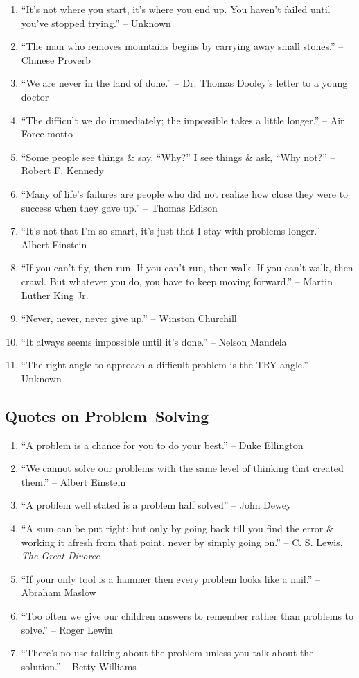 \documentclass{article}
\begin{document}
\begin{enumerate}
	\item ``It's not where you start, it's where you end up. You haven't failed until you've stopped trying.'' -- Unknown
	\item ``The man who removes mountains begins by carrying away small stones.'' -- Chinese Proverb
	\item ``We are never in the land of done.'' -- Dr. Thomas Dooley's letter to a young doctor
	\item ``The difficult we do immediately; the impossible takes a little longer.'' -- Air Force motto
	\item ``Some people see things \& say, ``Why?'' I see things \& ask, ``Why not?'' -- Robert F. Kennedy
	\item ``Many of life's failures are people who did not realize how close they were to success when they gave up.'' -- Thomas Edison
	\item ``It's not that I'm so smart, it's just that I stay with problems longer.'' -- Albert Einstein
	\item ``If you can't fly, then run. If you can't run, then walk. If you can't walk, then crawl. But whatever you do, you have to keep moving forward.'' -- Martin Luther King Jr.
	\item ``Never, never, never give up.'' -- Winston Churchill
	\item ``It always seems impossible until it's done.'' -- Nelson Mandela
	\item ``The right angle to approach a difficult problem is the TRY-angle.'' -- Unknown
\end{enumerate}

\subsection{Quotes on Problem--Solving}

\begin{enumerate}
	\item ``A problem is a chance for you to do your best.'' -- Duke Ellington
	\item ``We cannot solve our problems with the same level of thinking that created them.'' -- Albert Einstein
	\item ``A problem well stated is a problem half solved'' -- John Dewey
	\item ``A sum can be put right: but only by going back till you find the error \& working it afresh from that point, never by simply going on.'' -- C. S. Lewis, \textit{The Great Divorce}
	\item ``If your only tool is a hammer then every problem looks like a nail.'' -- Abraham Maslow
	\item ``Too often we give our children answers to remember rather than problems to solve.'' -- Roger Lewin
	\item ``There's no use talking about the problem unless you talk about the solution.'' -- Betty Williams
\end{enumerate}
\end{document}
